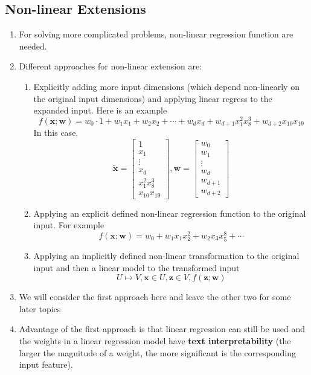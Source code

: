 \documentclass[11pt]{article}
\begin{document}
\begin{enumerate}
\subsection{Non-linear Extensions}
\begin{enumerate}
\item For solving more complicated problems, non-linear regression function are needed.
\item Different approaches for non-linear extension are:
\begin{enumerate}
\item Explicitly adding more input dimensions (which depend non-linearly on the original input dimensions) and applying linear regress to the expanded input. Here is an example
$$f(\mathbf{x}; \mathbf{w}) = w_0 \cdot 1 + w_1 x_1 + w_2 x_2 +\cdots + w_d x_d + w_{d+1} x_1^{2} x_8^{3} + w_{d+2} x_{10} x_{19} $$ In this case, $$\mathbf{\tilde{x}} = \begin{bmatrix}
1\\x_1 \\ \vdots \\ x_d \\ x_1^{2} x_8^{3} \\ x_{10} x_{19}
\end{bmatrix}, \mathbf{w} = \begin{bmatrix}
w_0\\ w_1 \\ \vdots \\ w_{d} \\ w_{d+1} \\ w_{d+2}
\end{bmatrix}$$
\item Applying an explicit defined non-linear regression function to the original input. For example $$f(\mathbf{x}; \mathbf{w}) = w_0 + w_1 x_1 x_2 ^2 + w_2 x_3 x_5 ^8 + \cdots$$
\item Applying an implicitly defined non-linear transformation to the original input and then a linear model to the transformed input $$ U \mapsto V, \mathbf{x} \in U, \mathbf{z} \in V, f(\mathbf{z}; \mathbf{w})$$
\end{enumerate}
\item We will consider the first approach here and leave the other two for some later topics
\item Advantage of the first approach is that linear regression can still be used and the weights in a linear regression model have \textbf{text interpretability} (the larger the magnitude of a weight, the more significant is the corresponding input feature).

\end{enumerate}
\end{enumerate}
\end{document}
